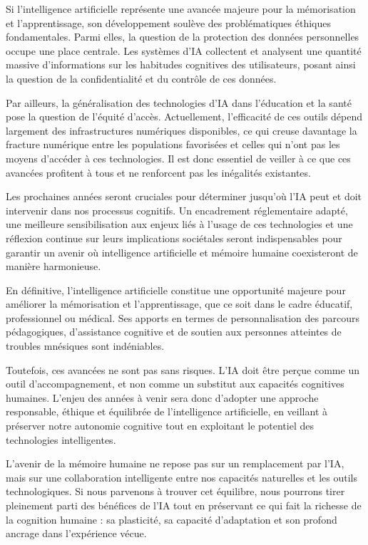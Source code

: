 \documentclass[11pt,a4paper]{report}
\begin{document}
Si l’intelligence artificielle représente une avancée majeure pour la mémorisation et l’apprentissage, son développement soulève des problématiques éthiques fondamentales. Parmi elles, la question de la protection des données personnelles occupe une place centrale. Les systèmes d’IA collectent et analysent une quantité massive d’informations sur les habitudes cognitives des utilisateurs, posant ainsi la question de la confidentialité et du contrôle de ces données.

Par ailleurs, la généralisation des technologies d’IA dans l’éducation et la santé pose la question de l’équité d’accès. Actuellement, l’efficacité de ces outils dépend largement des infrastructures numériques disponibles, ce qui creuse davantage la fracture numérique entre les populations favorisées et celles qui n’ont pas les moyens d’accéder à ces technologies. Il est donc essentiel de veiller à ce que ces avancées profitent à tous et ne renforcent pas les inégalités existantes.

Les prochaines années seront cruciales pour déterminer jusqu’où l’IA peut et doit intervenir dans nos processus cognitifs. Un encadrement réglementaire adapté, une meilleure sensibilisation aux enjeux liés à l’usage de ces technologies et une réflexion continue sur leurs implications sociétales seront indispensables pour garantir un avenir où intelligence artificielle et mémoire humaine coexisteront de manière harmonieuse.

En définitive, l’intelligence artificielle constitue une opportunité majeure pour améliorer la mémorisation et l’apprentissage, que ce soit dans le cadre éducatif, professionnel ou médical. Ses apports en termes de personnalisation des parcours pédagogiques, d’assistance cognitive et de soutien aux personnes atteintes de troubles mnésiques sont indéniables.

Toutefois, ces avancées ne sont pas sans risques. L’IA doit être perçue comme un outil d’accompagnement, et non comme un substitut aux capacités cognitives humaines. L’enjeu des années à venir sera donc d’adopter une approche responsable, éthique et équilibrée de l’intelligence artificielle, en veillant à préserver notre autonomie cognitive tout en exploitant le potentiel des technologies intelligentes.

L’avenir de la mémoire humaine ne repose pas sur un remplacement par l’IA, mais sur une collaboration intelligente entre nos capacités naturelles et les outils technologiques. Si nous parvenons à trouver cet équilibre, nous pourrons tirer pleinement parti des bénéfices de l’IA tout en préservant ce qui fait la richesse de la cognition humaine : sa plasticité, sa capacité d’adaptation et son profond ancrage dans l’expérience vécue.
\end{document}
